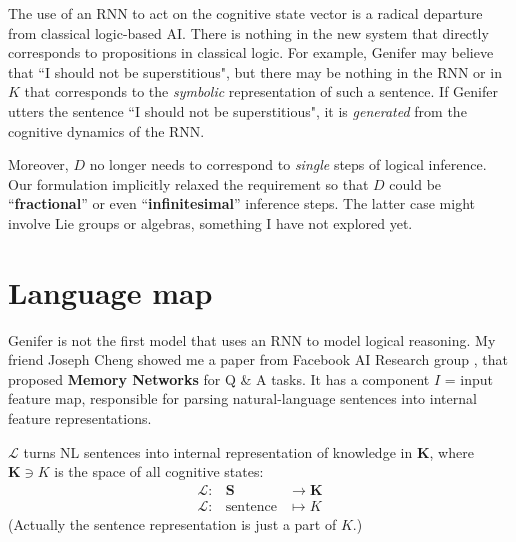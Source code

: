 \documentclass[12pt]{article}
\begin{document}
The use of an RNN to act on the cognitive state vector is a radical departure from classical logic-based AI.  There is nothing in the new system that directly corresponds to propositions in classical logic.  For example, Genifer may believe that ``I should not be superstitious", but there may be nothing in the RNN or in $K$ that corresponds to the \textit{symbolic} representation of such a sentence.  If Genifer utters the sentence ``I should not be superstitious", it is \textit{generated} from the cognitive dynamics of the RNN.

Moreover, $D$ no longer needs to correspond to \textit{single} steps of logical inference.  Our formulation implicitly relaxed the requirement so that $D$ could be ``\textbf{fractional}'' or even ``\textbf{infinitesimal}'' inference steps.  The latter case might involve Lie groups or algebras, something I have not explored yet.

\section{Language map}

Genifer is not the first model that uses an RNN to model logical reasoning.  My friend Joseph Cheng showed me a paper from Facebook AI Research group \cite{Weston2015}, that proposed \textbf{Memory Networks} for Q \& A tasks.  It has a component $I$ = input feature map, responsible for parsing natural-language sentences into internal feature representations.

$\mathcal{L}$ turns NL sentences into internal representation of knowledge in $\mathbf{K}$, where $\mathbf{K} \ni K$ is the space of all cognitive states:
\begin{eqnarray}
\mathcal{L} :& \mathbf{S} & \rightarrow \mathbf{K} \nonumber \\
\mathcal{L} :& \mbox{sentence} & \mapsto K \nonumber
\end{eqnarray}
(Actually the sentence representation is just a part of $K$.)

\begin{center}
\end{center}
\end{document}
